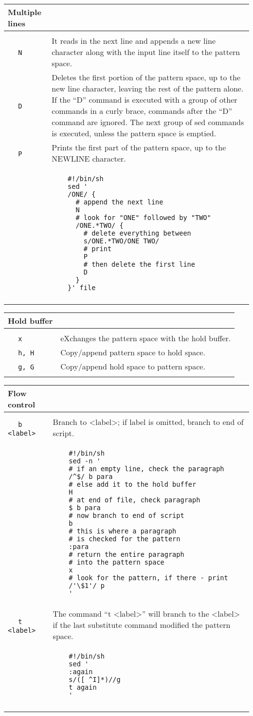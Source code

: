 \documentclass[a4paper,10pt,landscape,twocolumn]{article}
\newcommand{\commanddescr}[2]{\small ~~ \texttt{#1} & \small #2 \smallskip \\ }
\newenvironment{mycommands}[1]
               { \begin{tabular}{lp{9cm}} \\
                   \large{\textbf{#1}} \medskip \\ \hline \\}
               { \\ \hline \end{tabular} \medskip }
\begin{document}
\begin{mycommands}{Multiple lines}

  \commanddescr{N}{ 
    It reads in the next line and appends a new line character 
    along with the input line itself to the pattern space. 
  }

  \commanddescr{D}{ 
    Deletes the first portion of the pattern space, up
    to the new line character, leaving the rest of the pattern alone.
    If the ``D'' command is executed with a group of other commands in a
    curly brace, commands after the ``D'' command are ignored. The next
    group of sed commands is executed, unless the pattern space is
    emptied.
  }

  \commanddescr{P}{
    Prints the first part of the pattern space, up to the NEWLINE character. 
  }
  &
  \begin{lstlisting}
    #!/bin/sh
    sed '
    /ONE/ {
      # append the next line
      N
      # look for "ONE" followed by "TWO"
      /ONE.*TWO/ {
        # delete everything between
        s/ONE.*TWO/ONE TWO/
        # print
        P
        # then delete the first line
        D
      }
    }' file
  \end{lstlisting}
  \\
\end{mycommands}

\begin{mycommands}{Hold buffer}
  
  \commanddescr{x}{
    eXchanges the pattern space with the hold buffer.
  }

  \commanddescr{h, H}{
    Copy/append pattern space to hold space.
  }

  \commanddescr{g, G}{
    Copy/append hold space to pattern space.
  }


\end{mycommands}
\pagebreak
\begin{mycommands}{Flow control}
  
  \commanddescr{b <label>}{
    Branch to <label>; if label is omitted, branch to end of script.
  }  
  &
  \begin{lstlisting}
    #!/bin/sh
    sed -n '
    # if an empty line, check the paragraph
    /^$/ b para
    # else add it to the hold buffer
    H
    # at end of file, check paragraph
    $ b para
    # now branch to end of script
    b
    # this is where a paragraph 
    # is checked for the pattern
    :para
    # return the entire paragraph
    # into the pattern space
    x
    # look for the pattern, if there - print
    /'\$1'/ p
    '
  \end{lstlisting}
  \\

  \commanddescr{t <label>}{
    The command ``t <label>'' will branch to the <label> if the last 
    substitute command modified the pattern space. 
}
  &
  \begin{lstlisting}
    #!/bin/sh
    sed '
    :again
    s/([ ^I]*)//g
    t again
    '
  \end{lstlisting}
  \\

  
\end{mycommands}
\end{document}
